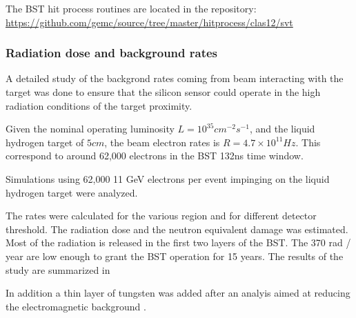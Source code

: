 The BST hit process routines are located in the repository: \url{https://github.com/gemc/source/tree/master/hitprocess/clas12/svt}

\subsubsection{Radiation dose and background rates}
A detailed study of the backgrond rates coming from beam interacting with the target was done to ensure that the silicon sensor
could operate in the high radiation conditions of the target proximity.

Given the nominal operating luminosity $L=10^{35} cm^{-2}s^{-1}$, and the liquid hydrogen target of $5 cm$, the beam electron rates
is $R=4.7 \times 10^{11} Hz$. This correspond to around 62,000 electrons in the BST 132ns time window.

Simulations using 62,000 11 GeV electrons per event impinging on the liquid hydrogen target were analyzed.


The rates were calculated for the various region and for different detector threshold.
The radiation dose and the neutron equivalent damage was estimated. Most of the radiation
is released in the first two layers of the BST.
The 370 rad / year are low enough to grant the BST operation for 15 years. The results of the study
are summarized in 

In addition a thin layer of tungsten was added after an analyis aimed at reducing the electromagnetic
background \cite{bstDose}.

